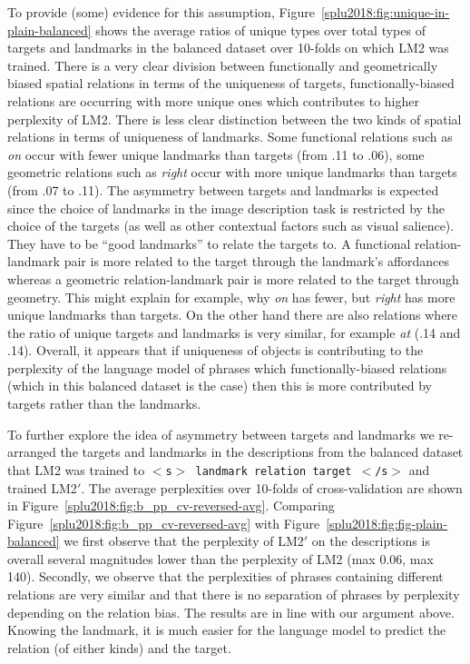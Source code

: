 To provide
(some) evidence for this assumption,
Figure~\ref{splu2018:fig:unique-in-plain-balanced} shows the average ratios of
unique types over total types of targets and landmarks in the balanced
dataset over 10-folds on which LM2 was trained. There is a very clear
division between functionally and geometrically biased spatial
relations in terms of the uniqueness of targets, functionally-biased
relations are occurring with more unique ones which contributes to
higher perplexity of LM2. There is less clear distinction between the
two kinds of spatial relations in terms of uniqueness of
landmarks. Some functional relations such as \emph{on} occur with fewer
unique landmarks than targets (from .11 to .06), some geometric
relations such as \emph{right} occur with more unique landmarks than
targets (from .07 to .11). The asymmetry between targets and landmarks
is expected since the choice of landmarks in the image description
task is restricted by the choice of the targets (as well as other
contextual factors such as visual salience). They have to be ``good
landmarks'' to relate the targets to. A functional relation-landmark
pair is more related to the target through the landmark's affordances
whereas a geometric relation-landmark pair is more related to the
target through geometry. This might explain for example, why \emph{on}
has fewer, but \emph{right} has more unique landmarks than targets. On
the other hand there are also relations where the ratio of unique
targets and landmarks is very similar, for example \emph{at} (.14 and
.14). Overall, it appears that if uniqueness of objects is
contributing to the perplexity of the language model of phrases which
functionally-biased relations (which in this balanced dataset is the
case) then this is more contributed by targets rather than the
landmarks.

To further explore the idea of asymmetry between targets and landmarks
we re-arranged the targets and landmarks in the descriptions from the
balanced dataset that LM2 was trained to \texttt{$<$s$>$ landmark
  relation target $<$/s$>$} and trained LM2$'$. The average
perplexities over 10-folds of cross-validation are shown in
Figure~\ref{splu2018:fig:b_pp_cv-reversed-avg}. Comparing
Figure~\ref{splu2018:fig:b_pp_cv-reversed-avg} with
Figure~\ref{splu2018:fig:fig-plain-balanced} we first observe that the
perplexity of LM2$'$ on the descriptions is overall several magnitudes
lower than the perplexity of LM2 (max 0.06, max 140). Secondly, we
observe that the perplexities of phrases containing different
relations are very similar and that there is no separation of phrases
by perplexity depending on the relation bias. The results are in line
with our argument above. Knowing the landmark, it is much easier for
the language model to predict the relation (of either kinds) and the
target.


